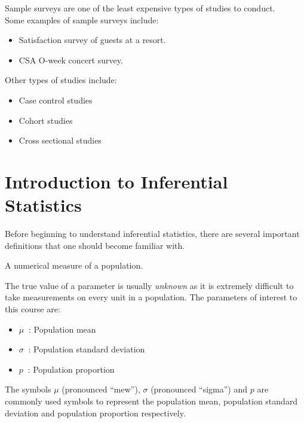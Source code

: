 \noindent
Sample surveys are one of the least expensive types of studies to conduct.\\

\noindent
Some examples of sample surveys include:

\begin{itemize}
\item	Satisfaction survey of guests at a resort.
\item	CSA O-week concert survey.
\end{itemize}


\begin{nt}
Other types of studies include:
	\begin{itemize}
	\item	Case control studies
	\item	Cohort studies
	\item	Cross sectional studies
	\end{itemize}
\end{nt}

\section{Introduction to Inferential Statistics}

Before beginning to understand inferential statistics, there are several important definitions that one should become familiar with.

\begin{definition}[Parameter]	
A numerical measure of a population.
\end{definition}

The true value of a parameter is usually \textit{unknown} as it is extremely difficult to take measurements on every unit in a population. The parameters of interest to this course are:

\begin{itemize}
	\item[]	$\mu \>$	 	:	Population mean
	\item[]	$\sigma \>$	:  	Population standard deviation
	\item[]	$p \>$		:  	Population proportion
\end{itemize}

\noindent
The symbols $\mu$ (pronounced ``mew''), $\sigma$ (pronounced ``sigma'') and $p$ are commonly used symbols to represent the population mean, population standard deviation and population proportion respectively.

